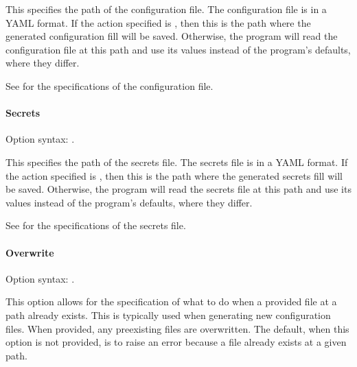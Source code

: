 \documentclass[letterpaper,11pt,english]{sphinxmanual}
\begin{document}
\sphinxAtStartPar
This specifies the path of the configuration file. The configuration file is
in a YAML format. If the action specified is , then this is the
path where the generated configuration fill will be saved. Otherwise, the
program will read the configuration file at this path and use its values
instead of the program’s defaults, where they differ.

\sphinxAtStartPar
See {\hyperref[\detokenize{user/configuration:user-configuration-standard-configuration-file}]{}} for the
specifications of the configuration file.


\paragraph{Secrets}
\label{\detokenize{user/command_line:secrets}}\label{\detokenize{user/command_line:user-command-line-available-options-secrets}}
\sphinxAtStartPar
Option syntax: .

\sphinxAtStartPar
This specifies the path of the secrets file. The secrets file is
in a YAML format. If the action specified is , then this is the
path where the generated secrets fill will be saved. Otherwise, the
program will read the secrets file at this path and use its values
instead of the program’s defaults, where they differ.

\sphinxAtStartPar
See {\hyperref[\detokenize{user/configuration:user-configuration-secrets-configuration-file}]{}} for the
specifications of the secrets file.


\paragraph{Overwrite}
\label{\detokenize{user/command_line:overwrite}}
\sphinxAtStartPar
Option syntax: .

\sphinxAtStartPar
This option allows for the specification of what to do when a provided
file at a path already exists. This is typically used when generating new
configuration files. When provided, any pre\sphinxhyphen{}existing files are overwritten.
The default, when this option is not provided, is to raise an error because a
file already exists at a given path.
\end{document}
